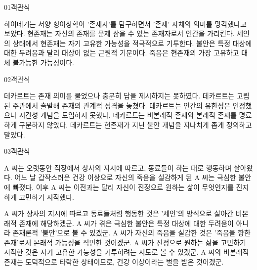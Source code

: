 \documentclass[fs85,seriesWit]{korfarm-base}
\begin{document}
\kfBeginMC
\begin{kfQBlock}{01}{객관식}
\begin{kfChoices}
\kfChoice 하이데거는 서양 형이상학이 '존재자'를 탐구하면서 '존재' 자체의 의미를 망각했다고 보았다.
\kfChoice 현존재는 자신의 존재를 문제 삼을 수 있는 존재자로서 인간을 가리킨다.
\kfChoice 세인의 상태에서 현존재는 자기 고유한 가능성을 적극적으로 기투한다.
\kfChoice 불안은 특정 대상에 대한 두려움과 달리 대상이 없는 근원적 기분이다.
\kfChoice 죽음은 현존재의 가장 고유하고 대체 불가능한 가능성이다.
\end{kfChoices}
\end{kfQBlock}

\begin{kfQBlock}{02}{객관식}
\begin{kfChoices}
\kfChoice 데카르트는 존재 의미를 물었으나 충분히 답을 제시하지는 못하였다.
\kfChoice 데카르트는 고립된 주관에서 출발해 존재의 관계적 성격을 놓쳤다.
\kfChoice 데카르트는 인간의 유한성은 인정했으나 시간성 개념을 도입하지 못했다.
\kfChoice 데카르트는 비본래적 존재와 본래적 존재를 명료하게 구분하지 않았다.
\kfChoice 데카르트는 현존재가 지닌 불안 개념을 지나치게 좁게 정의하고 말았다.
\end{kfChoices}
\end{kfQBlock}

\begin{kfQBlock}{03}{객관식}
\begin{kfEvidence}A 씨는 오랫동안 직장에서 상사의 지시에 따르고, 동료들이 하는 대로 행동하며 살아왔다. 어느 날 갑작스러운 건강 이상으로 자신의 죽음을 실감하게 된 A 씨는 극심한 불안에 빠졌다. 이후 A 씨는 이전과는 달리 자신이 진정으로 원하는 삶이 무엇인지를 진지하게 고민하기 시작했다.\end{kfEvidence}
\begin{kfChoices}
\kfChoice A 씨가 상사의 지시에 따르고 동료들처럼 행동한 것은 '세인'의 방식으로 살아간 비본래적 존재에 해당하겠군.
\kfChoice A 씨가 겪은 극심한 불안은 특정 대상에 대한 두려움이 아니라 존재론적 '불안'으로 볼 수 있겠군.
\kfChoice A 씨가 자신의 죽음을 실감한 것은 '죽음을 향한 존재'로서 본래적 가능성을 직면한 것이겠군.
\kfChoice A 씨가 진정으로 원하는 삶을 고민하기 시작한 것은 자기 고유한 가능성을 기투하려는 시도로 볼 수 있겠군.
\kfChoice A 씨의 비본래적 존재는 도덕적으로 타락한 상태이므로, 건강 이상이라는 벌을 받은 것이겠군.
\end{kfChoices}
\end{kfQBlock}
\end{document}
